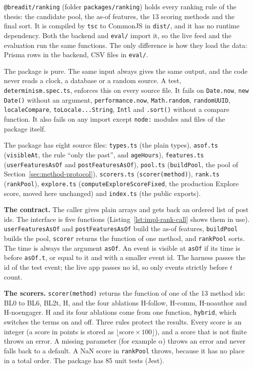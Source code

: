 \texttt{@breadit/ranking} (folder \texttt{packages/ranking}) holds every ranking rule of the thesis: the candidate pool, the as-of features, the 13 scoring methods and the final sort. It is compiled by \texttt{tsc} to CommonJS in \texttt{dist/}, and it has no runtime dependency. Both the backend and \texttt{eval/} import it, so the live feed and the evaluation run the same functions. The only difference is how they load the data: Prisma rows in the backend, CSV files in \texttt{eval/}.

The package is pure. The same input always gives the same output, and the code never reads a clock, a database or a random source. A test, \texttt{determinism.spec.ts}, enforces this on every source file. It fails on \texttt{Date.now}, \texttt{new Date()} without an argument, \texttt{performance.now}, \texttt{Math.random}, \texttt{randomUUID}, \texttt{localeCompare}, \texttt{toLocale...String}, \texttt{Intl} and \texttt{.sort()} without a compare function. It also fails on any import except \texttt{node:} modules and files of the package itself.

The package has eight source files: \texttt{types.ts} (the plain types), \texttt{asof.ts} (\texttt{visibleAt}, the rule ``only the past'', and \texttt{ageHours}), \texttt{features.ts} (\texttt{userFeatures\allowbreak AsOf} and \texttt{postFeatures\allowbreak AsOf}), \texttt{pool.ts} (\texttt{buildPool}, the pool of Section~\ref{sec:method-protocol}), \texttt{scorers.ts} (\texttt{scorer(method)}), \texttt{rank.ts} (\texttt{rankPool}), \texttt{explore.ts} (\texttt{compute\allowbreak Explore\allowbreak ScoreFixed}, the production Explore score, moved here unchanged) and \texttt{index.ts} (the public exports).

\textbf{The contract.} The caller gives plain arrays and gets back an ordered list of post ids. The interface is five functions (Listing~\ref{lst:impl-rank-call} shows them in use). \texttt{userFeaturesAsOf} and \texttt{postFeaturesAsOf} build the as-of features, \texttt{buildPool} builds the pool, \texttt{scorer} returns the function of one method, and \texttt{rankPool} sorts. The time is always the argument \texttt{asOf}. An event is visible at \texttt{asOf} if its time is before \texttt{asOf.t}, or equal to it and with a smaller event id. The harness passes the id of the test event; the live app passes no id, so only events strictly before $t$ count.

\textbf{The scorers.} \texttt{scorer(method)} returns the function of one of the 13 method ids: BL0 to BL6, BL2t, H, and the four ablations H-follow, H-comm, H-noauthor and H-noengager. H and its four ablations come from one function, \texttt{hybrid}, which switches the terms on and off. Three rules protect the results. Every score is an integer (a score in points is stored as $\lfloor \text{score} \times 100 \rfloor$), and a score that is not finite throws an error. A missing parameter (for example $\alpha$) throws an error and never falls back to a default. A NaN score in \texttt{rankPool} throws, because it has no place in a total order. The package has 85 unit tests (Jest).

